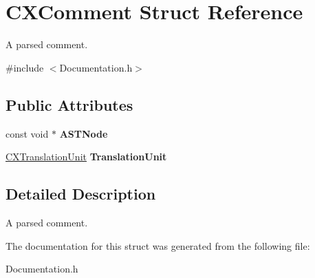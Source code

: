 \hypertarget{structCXComment}{}\section{C\+X\+Comment Struct Reference}
\label{structCXComment}


A parsed comment.  




{\ttfamily \#include $<$Documentation.\+h$>$}

\subsection*{Public Attributes}
\begin{DoxyCompactItemize}
\item 
\mbox{\label{structCXComment_a0f56ce2a03f4e8bd97136a1e74a822e5}} 
const void $\ast$ {\bfseries A\+S\+T\+Node}
\item 
\mbox{\label{structCXComment_a685e6ba020c81779ef2811141a8e345b}} 
\hyperlink{group__CINDEX_gacdb7815736ca709ce9a5e1ec2b7e16ac}{C\+X\+Translation\+Unit} {\bfseries Translation\+Unit}
\end{DoxyCompactItemize}


\subsection{Detailed Description}
A parsed comment. 

The documentation for this struct was generated from the following file\+:\begin{DoxyCompactItemize}
\item 
Documentation.\+h\end{DoxyCompactItemize}
